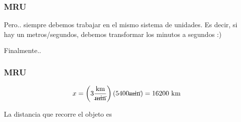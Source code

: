 \documentclass{beamer}
\begin{document}
\begin{frame}
\frametitle{MRU}
% 
{\huge \xmru}

Pero.. siempre debemos trabajar en el mismo sistema de unidades.
Es decir, si hay un metros/segundos,
debemos transformar los 
minutos a segundos :)

\begin{center}
\end{center}

Finalmente..

\end{frame}



\begin{frame}
\frametitle{MRU}
% 
{\large
\begin{equation}
x=
\left(3\frac{\text{km}}{\cancel{\text{min}}}\right)
(5400\cancel{\text{min}})=
16200\text{ km}
\end{equation}}


La distancia que recorre el objeto es

\end{frame}
\end{document}
